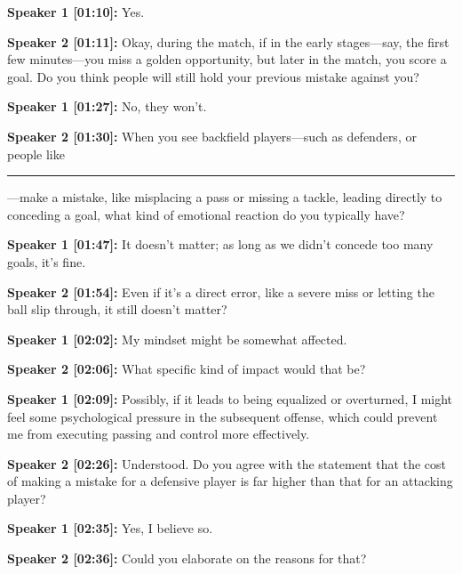 \documentclass[11pt,a4paper]{article}
\newcommand{\redacted}{\rule{2.5cm}{2ex}}
\begin{document}
\begin{linenumbers}
\vspace{0.5em}
\noindent \textbf{Speaker 1 [01:10]:} Yes.

\vspace{0.5em}
\noindent \textbf{Speaker 2 [01:11]:} Okay, during the match, if in the early stages---say, the first few minutes---you miss a golden opportunity, but later in the match, you score a goal. Do you think people will still hold your previous mistake against you?

\vspace{0.5em}
\noindent \textbf{Speaker 1 [01:27]:} No, they won't.

\vspace{0.5em}
\noindent \textbf{Speaker 2 [01:30]:} When you see backfield players---such as defenders, or people like \redacted---make a mistake, like misplacing a pass or missing a tackle, leading directly to conceding a goal, what kind of emotional reaction do you typically have?

\vspace{0.5em}
\noindent \textbf{Speaker 1 [01:47]:} It doesn't matter; as long as we didn't concede too many goals, it's fine.

\vspace{0.5em}
\noindent \textbf{Speaker 2 [01:54]:} Even if it's a direct error, like a severe miss or letting the ball slip through, it still doesn't matter?

\vspace{0.5em}
\noindent \textbf{Speaker 1 [02:02]:} My mindset might be somewhat affected.

\vspace{0.5em}
\noindent \textbf{Speaker 2 [02:06]:} What specific kind of impact would that be?

\vspace{0.5em}
\noindent \textbf{Speaker 1 [02:09]:} Possibly, if it leads to being equalized or overturned, I might feel some psychological pressure in the subsequent offense, which could prevent me from executing passing and control more effectively.

\vspace{0.5em}
\noindent \textbf{Speaker 2 [02:26]:} Understood. Do you agree with the statement that the cost of making a mistake for a defensive player is far higher than that for an attacking player?

\vspace{0.5em}
\noindent \textbf{Speaker 1 [02:35]:} Yes, I believe so.

\vspace{0.5em}
\noindent \textbf{Speaker 2 [02:36]:} Could you elaborate on the reasons for that?


\end{linenumbers}
\end{document}

